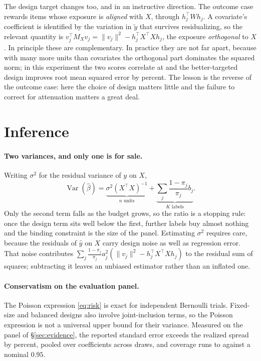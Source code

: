 \documentclass[11pt]{article}
\newcommand{\Var}{\operatorname{Var}}
\theoremstyle{plain}
\theoremstyle{remark}
\begin{document}
The design target changes too, and in an instructive direction. The outcome case rewards items whose exposure is \emph{aligned} with $X$, through $h_j^\top W h_j$. A covariate's coefficient is identified by the variation in $\widetilde y$ that survives residualizing, so the relevant quantity is $v_j^\top M_X v_j=\|v_j\|^2-h_j^\top X^\top X h_j$, the exposure \emph{orthogonal} to $X$. In principle these are complementary. In practice they are not far apart, because with many more units than covariates the orthogonal part dominates the squared norm; in this experiment the two scores correlate at \ScoreCorrelation{} and the better-targeted design improves root mean squared error by \RegressorGainPct{} percent. The lesson is the reverse of the outcome case: here the choice of design matters little and the failure to correct for attenuation matters a great deal.

\section{Inference}
\label{sec:inference}

\paragraph{Two variances, and only one is for sale.} Writing $\sigma^2$ for the residual variance of $y$ on $X$,
\[
\Var(\widehat\beta)=\underbrace{\sigma^2(X^\top X)^{-1}}_{\text{$n$ units}}+\underbrace{\textstyle\sum_j\frac{1-\pi_j}{\pi_j}b_j}_{\text{$K$ labels}} .
\]
Only the second term falls as the budget grows, so the ratio is a stopping rule: once the design term sits well below the first, further labels buy almost nothing and the binding constraint is the size of the panel. Estimating $\sigma^2$ requires care, because the residuals of $\widehat y$ on $X$ carry design noise as well as regression error. That noise contributes $\sum_j\frac{1-\pi_j}{\pi_j}a_j^2(\|v_j\|^2-h_j^\top X^\top Xh_j)$ to the residual sum of squares; subtracting it leaves an unbiased estimator rather than an inflated one.

\paragraph{Conservatism on the evaluation panel.} The Poisson expression \eqref{eq:risk} is exact for independent Bernoulli trials. Fixed-size and balanced designs also involve joint-inclusion terms, so the Poisson expression is not a universal upper bound for their variance. Measured on the panel of \S\ref{sec:evidence}, the reported standard error exceeds the realized spread by \CubeSeExcess{} percent, pooled over coefficients across \CubeReps{} draws, and coverage runs to \CubeCoverage{} against a nominal $0.95$.
\end{document}
